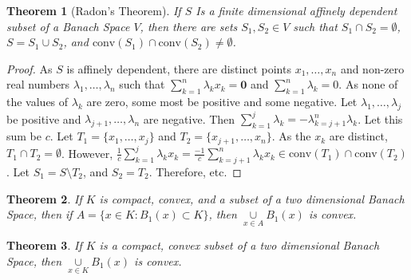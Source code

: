 \documentclass[crop=false,class=book]{standalone}
\theoremstyle{mystyle}
\newtheorem{theorem}{Theorem}[section]
\begin{document}
\begin{theorem}[Radon's Theorem]
If $S$ Is a finite dimensional affinely dependent subset of a Banach Space $V$, then there are sets $S_1,S_2\in V$ such that $S_1\cap S_2 = \emptyset$, $S=S_1\cup S_2$, and $\textrm{conv}(S_1)\cap \textrm{conv}(S_2) \ne \emptyset$.
\end{theorem}
\begin{proof}
As $S$ is affinely dependent, there are distinct points $x_1,\hdots,x_n$ and non-zero real numbers $\lambda_1,\hdots,\lambda_n$ such that $\sum_{k=1}^{n}\lambda_k x_k= \mathbf{0}$ and $\sum_{k=1}^{n}\lambda_k = 0$. As none of the values of $\lambda_k$ are zero, some most be positive and some negative. Let $\lambda_1,\hdots, \lambda_j$ be positive and $\lambda_{j+1},\hdots, \lambda_n$ are negative. Then $\sum_{k=1}^{j} \lambda_k = - \lambda_{k=j+1}^{n}\lambda_k$. Let this sum be $c$. Let $T_1 = \{x_1,\hdots, x_j\}$ and $T_2=\{x_{j+1},\hdots, x_{n}\}$. As the $x_k$ are distinct, $T_1\cap T_2 = \emptyset$. However, $\frac{1}{c}\sum_{k=1}^{j}\lambda_k x_k = \frac{-1}{c}\sum_{k=j+1}^{n} \lambda_k x_k \in\textrm{conv}(T_1)\cap \textrm{conv}(T_2)$. Let $S_1 = S\setminus T_2$, and $S_2 = T_2$. Therefore, etc.
\end{proof}
\begin{theorem}
If $K$ is compact, convex, and a subset of a two dimensional Banach Space, then if $A = \{x\in K:B_{1}(x)\subset K\}$, then $\underset{x\in A}\cup B_{1}(x)$ is convex.
\end{theorem}
\begin{theorem}
If $K$ is a compact, convex subset of a two dimensional Banach Space, then $\underset{x\in K}\cup B_{1}(x)$ is convex.
\end{theorem}
\end{document}
